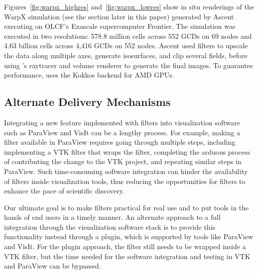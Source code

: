 Figures~\ref{fig:warpx_highres} and~\ref{fig:warpx_lowres} show in situ renderings of the WarpX simulation (see the section  later in this paper) generated by Ascent executing on OLCF's Exascale supercomputer Frontier.
The simulation was executed in two resolutions: 578.8 million cells across 552 GCDs on 69 nodes and 4.63 billion cells across 4,416 GCDs on 552 nodes.
Ascent used \vtkm filters to upscale the data along multiple axes, generate isosurfaces, and clip several fields, before using \vtkm's raytracer and volume renderer to generate the final images.
To guarantee performance, \vtkm uses the Kokkos backend for AMD GPUs. 


\subsection{Alternate Delivery Mechanisms}


Integrating a new feature implemented with \vtkm filters into visualization software such as ParaView and VisIt can be a lengthy process.
For example, making a \vtkm filter available in ParaView requires going through multiple steps, including implementing a VTK filter that wraps the \vtkm filter, completing the arduous process of contributing the change to the VTK project, and repeating similar steps in ParaView.
Such time-consuming software integration can hinder the availability of \vtkm filters inside visualization tools, thus reducing the opportunities for \vtkm filters to enhance the pace of scientific discovery.

Our ultimate goal is to make \vtkm filters practical for real use and to put tools in the hands of end users in a timely manner.
An alternate approach to a full integration through the visualization software stack is to provide this functionality instead through a plugin, which is supported by tools like ParaView and VisIt.
For the plugin approach, the \vtkm filter still needs to be wrapped inside a VTK filter, but the time needed for the software integration and testing in VTK and ParaView can be bypassed.

